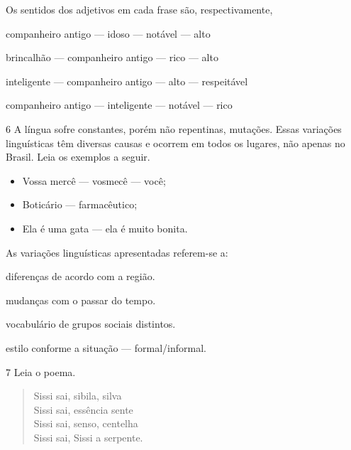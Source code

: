 Os sentidos dos adjetivos em cada frase são, respectivamente,

\begin{escolha}
\item companheiro antigo --- idoso --- notável --- alto

\item brincalhão --- companheiro antigo --- rico --- alto

\item inteligente --- companheiro antigo --- alto --- respeitável

\item companheiro antigo --- inteligente --- notável --- rico
\end{escolha}



\num{6} A língua sofre constantes, porém não repentinas, mutações. Essas
variações linguísticas têm diversas causas e ocorrem em todos os
lugares, não apenas no Brasil. Leia os exemplos a seguir.

\begin{itemize}
\item Vossa mercê --- vosmecê --- você;

\item Boticário --- farmacêutico;

\item Ela é uma gata --- ela é muito bonita.
\end{itemize}

As variações linguísticas apresentadas referem-se a:

\begin{escolha}
\item diferenças de acordo com a região.

\item mudanças com o passar do tempo.

\item vocabulário de grupos sociais distintos.

\item estilo conforme a situação --- formal/informal.
\end{escolha}


\num{7} Leia o poema.

\begin{verse}
Sissi sai, sibila, silva\\
Sissi sai, essência sente\\
Sissi sai, senso, centelha\\
Sissi sai, Sissi a serpente.

\end{verse}

